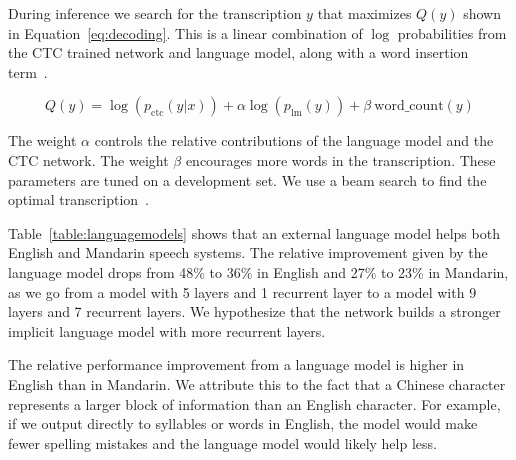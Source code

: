 During inference we search for the transcription $y$ that maximizes $Q(y)$
shown in Equation~\ref{eq:decoding}. This is a linear combination of $\log$
probabilities from the CTC trained network and language model, along with a
word insertion term~\cite{hannun2014deepspeech}. 

\begin{equation}
\label{eq:decoding}
Q(y) = \log (p_{\textrm{ctc}}(y|x)) + \alpha \log(p_{\textrm{lm}}(y))  + \beta \: \textrm{word\_count}(y)
\end{equation}

The weight $\alpha$ controls the relative contributions of the language model
and the CTC network. The weight $\beta$ encourages more words in the
transcription. These parameters are tuned on a development set. We use a beam
search to find the optimal transcription~\cite{hannun2014firstpass}.


Table~\ref{table:languagemodels} shows that an external language model helps
both English and Mandarin speech systems. The relative improvement given by the
language model drops from 48\% to 36\% in English and 27\% to 23\% in Mandarin,
as we go from a model with 5 layers and 1 recurrent layer to a model with 9
layers and 7 recurrent layers. We hypothesize that the network builds a
stronger implicit language model with more recurrent layers. 

The relative performance improvement from a language model is higher in English
than in Mandarin. We attribute this to the fact that a Chinese character
represents a larger block of information than an English character. For
example, if we output directly to syllables or words in English, the model
would make fewer spelling mistakes and the language model would likely help
less.

